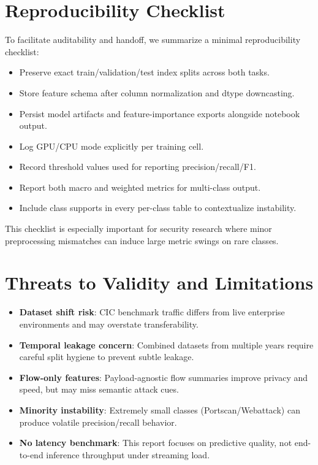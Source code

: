 \documentclass[10pt,journal]{IEEEtran}
\begin{document}
\section{Reproducibility Checklist}
To facilitate auditability and handoff, we summarize a minimal reproducibility checklist:
\begin{itemize}
\item Preserve exact train/validation/test index splits across both tasks.
\item Store feature schema after column normalization and dtype downcasting.
\item Persist model artifacts and feature-importance exports alongside notebook output.
\item Log GPU/CPU mode explicitly per training cell.
\item Record threshold values used for reporting precision/recall/F1.
\item Report both macro and weighted metrics for multi-class output.
\item Include class supports in every per-class table to contextualize instability.
\end{itemize}

This checklist is especially important for security research where minor preprocessing mismatches can induce large metric swings on rare classes.

\section{Threats to Validity and Limitations}
\begin{itemize}
\item \textbf{Dataset shift risk}: CIC benchmark traffic differs from live enterprise environments and may overstate transferability.
\item \textbf{Temporal leakage concern}: Combined datasets from multiple years require careful split hygiene to prevent subtle leakage.
\item \textbf{Flow-only features}: Payload-agnostic flow summaries improve privacy and speed, but may miss semantic attack cues.
\item \textbf{Minority instability}: Extremely small classes (Portscan/Webattack) can produce volatile precision/recall behavior.
\item \textbf{No latency benchmark}: This report focuses on predictive quality, not end-to-end inference throughput under streaming load.
\end{itemize}
\end{document}
